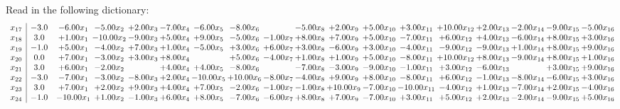 \documentclass[9pt]{article}
\begin{document}
Read in the following dictionary:
\[\begin{array}{c| c c@{\hskip 2pt} c@{\hskip 2pt} c@{\hskip 2pt} c@{\hskip 2pt} c@{\hskip 2pt} c@{\hskip 2pt} c@{\hskip 2pt} c@{\hskip 2pt} c@{\hskip 2pt} c@{\hskip 2pt} c@{\hskip 2pt} c@{\hskip 2pt} c@{\hskip 2pt} c@{\hskip 2pt} c@{\hskip 2pt} c@{\hskip 2pt} }
 x_{17}   &  -3.0 & -6.00 x_{1} & -5.00 x_{2} & +  2.00 x_{3} & -7.00 x_{4} & -6.00 x_{5} & -8.00 x_{6} &   & -5.00 x_{8} & +  2.00 x_{9} & +  5.00 x_{10} & +  3.00 x_{11} & + 10.00 x_{12} & +  2.00 x_{13} & -2.00 x_{14} & -9.00 x_{15} & -5.00 x_{16}\\
 x_{18}   &  3.0 & +  1.00 x_{1} & -10.00 x_{2} & -9.00 x_{3} & +  5.00 x_{4} & +  9.00 x_{5} & -5.00 x_{6} & -1.00 x_{7} & +  8.00 x_{8} & +  7.00 x_{9} & +  5.00 x_{10} & -7.00 x_{11} & +  6.00 x_{12} & +  4.00 x_{13} & -6.00 x_{14} & +  8.00 x_{15} & +  3.00 x_{16}\\
 x_{19}   &  -1.0 & +  5.00 x_{1} & -4.00 x_{2} & +  7.00 x_{3} & +  1.00 x_{4} & -5.00 x_{5} & +  3.00 x_{6} & +  6.00 x_{7} & +  3.00 x_{8} & -6.00 x_{9} & +  3.00 x_{10} & -4.00 x_{11} & -9.00 x_{12} & -9.00 x_{13} & +  1.00 x_{14} & +  8.00 x_{15} & +  9.00 x_{16}\\
 x_{20}   &  0.0 & +  7.00 x_{1} & -3.00 x_{2} & +  3.00 x_{3} & +  8.00 x_{4} &   & +  5.00 x_{6} & -4.00 x_{7} & +  1.00 x_{8} & +  1.00 x_{9} & +  5.00 x_{10} & -8.00 x_{11} & + 10.00 x_{12} & +  8.00 x_{13} & -9.00 x_{14} & +  8.00 x_{15} & +  1.00 x_{16}\\
 x_{21}   &  3.0 & +  6.00 x_{1} & -2.00 x_{2} &   & +  4.00 x_{4} & +  4.00 x_{5} & -8.00 x_{6} &   & -7.00 x_{8} & -3.00 x_{9} & -9.00 x_{10} & -1.00 x_{11} & +  3.00 x_{12} & -6.00 x_{13} &   & +  3.00 x_{15} & +  9.00 x_{16}\\
 x_{22}   &  -3.0 & -7.00 x_{1} & -3.00 x_{2} & -8.00 x_{3} & +  2.00 x_{4} & -10.00 x_{5} & + 10.00 x_{6} & -8.00 x_{7} & -4.00 x_{8} & +  9.00 x_{9} & +  8.00 x_{10} & -8.00 x_{11} & +  6.00 x_{12} & -1.00 x_{13} & -8.00 x_{14} & -6.00 x_{15} & +  3.00 x_{16}\\
 x_{23}   &  3.0 & +  7.00 x_{1} & +  2.00 x_{2} & +  9.00 x_{3} & +  4.00 x_{4} & +  7.00 x_{5} & -2.00 x_{6} & -1.00 x_{7} & -1.00 x_{8} & + 10.00 x_{9} & -7.00 x_{10} & -10.00 x_{11} & -4.00 x_{12} & +  1.00 x_{13} & -7.00 x_{14} & +  2.00 x_{15} & -4.00 x_{16}\\
 x_{24}   &  -1.0 & -10.00 x_{1} & +  1.00 x_{2} & -1.00 x_{3} & +  6.00 x_{4} & +  8.00 x_{5} & -7.00 x_{6} & -6.00 x_{7} & +  8.00 x_{8} & +  7.00 x_{9} & -7.00 x_{10} & +  3.00 x_{11} & +  5.00 x_{12} & +  2.00 x_{13} & -2.00 x_{14} & -9.00 x_{15} & +  5.00 x_{16}\\

\end{array}\]
\end{document}
